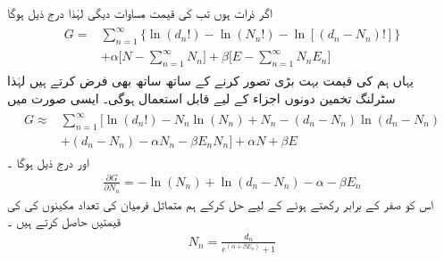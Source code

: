 
اگر ذرات   ہوں تب  کی قیمت مساوات  دیگی لہٰذا درج ذیل ہوگا 
\begin{gather}
\begin{aligned}
G =& \sum_{n = 1}^{\infty} \{ \ln(d_n !) - \ln(N_n !) - \ln[(d_n - N_n) !] \} \\
&+ \alpha \big [ N - \sum_{n = 1}^{\infty} N_n \big ] + \beta \big [ E - \sum_{n = 1}^{\infty} N_n E_n \big ]
\end{aligned}
\end{gather}
یہاں ہم  کی قیمت بہت بڑی تصور کرنے کے ساتھ ساتھ  بھی  فرض کرتے ہیں لہٰذا سٹرلنگ تخمین دونوں اجزاء کے لیے قابل استعمال ہوگی۔ ایسی صورت میں 
\begin{gather}
\begin{aligned} 
G \approx & \sum_{n = 1}^{\infty} \big [ \ln(d_n !) - N_n \ln(N_n) + N_n - (d_n - N_n) \ln(d_n - N_n) \\
&+ (d_n - N_n) - \alpha N_n - \beta E_n N_n \big ] + \alpha N + \beta E
\end{aligned}
\end{gather}
اور درج ذیل ہوگا ۔
\begin{align}
\frac{\partial G}{\partial N_n} = - \ln(N_n) + \ln(d_n - N_n) - \alpha - \beta E_n
\end{align}
اس کو صفر کے برابر رکھتے ہوئے  کے لیے حل کرکے ہم متماثل فرمیان کی تعداد مکینوں   کی    کی قیمتیں  حاصل کرتے ہیں ۔
\begin{align}\label{مساوات_متماثل_سب_سے_زیادہ_محتمل_برائے_فرمیان}
N_n = \frac{d_n}{e^{(\alpha + \beta E_n)}+1}
\end{align}

